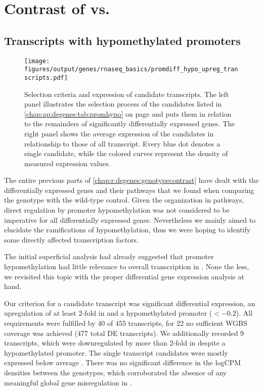 \section{Contrast of \dnmtchip vs. \dnmtwt}
\label{chap:r:degenes:genotypecontrast}

\subsection{Transcripts with hypomethylated promoters}
\label{chap:r:degenes:promhyposingle}

\begin{figure}[!ht]
	\texttt{[image: figures/output/genes/rnaseq\_basics/promdiff\_hypo\_upreg\_transcripts.pdf]} 
	\caption{Selection criteria and expression of candidate transcripts. The left panel illustrates the selection process of the candidates listed in \autoref{chap:ap:degenes:tab:promhypo} on page \pageref{chap:ap:degenes:tab:promhypo} and puts them in relation to the remainders of significantly differentially expressed genes. The right panel shows the average expression of the candidates in relationship to those of all transcript. Every blue dot denotes a single candidate, while the colored curves represent the density of measured expression values.}
	\label{fig:genes:promdiff_hypo_upreg_transcripts}
\end{figure}

The entire previous parts of \autoref{chap:r:degenes:genotypecontrast} have dealt with the differentially expressed genes and their pathways that we found when comparing the \dnmtchip genotype with the wild-type control. Given the organization in pathways, direct regulation by promoter hypomethylation was not considered to be imperative for all differentially expressed genes. Nevertheless we mainly aimed to elucidate the ramifications of hypomethylation, thus we were hoping to identify some directly affected transcription factors. 

The initial superficial analysis  had already suggested that promoter hypomethylation had little relevance to overall transcription in \dnmtchip. None the less, we revisited this topic with the proper differential gene expression analysis at hand. 

Our criterion for a candidate transcript was significant differential expression, an upregulation of at least 2-fold in \dnmtchip and a hypomethylated promoter ($< - 0.2$). All requirements were fulfilled by \num{40} of \num{455} transcripts, for \num{22} no sufficient WGBS coverage was achieved (\num{477} total DE transcripts). We additionally recorded \num{9} transcripts, which were downregulated by more than 2-fold in \dnmtchip despite a hypomethylated promoter. The single transcript candidates were mostly expressed below average . There was no significant difference in the logCPM densities between the genotypes, which corroborated the absence of any meaningful global gene misregulation in \dnmtchip {}. 

